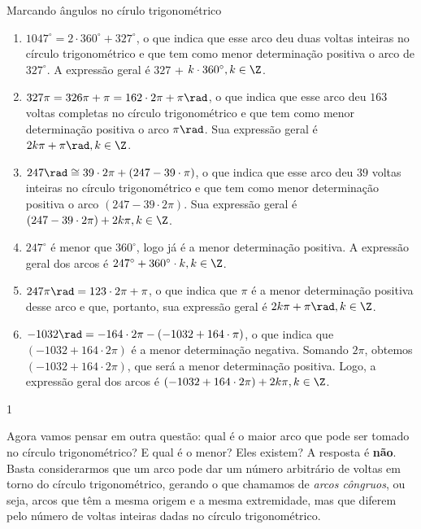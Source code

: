 \begin{answer}{Marcando ângulos no círulo trigonométrico}
{
\begin{enumerate}
\item $1047^{\circ} = 2\cdot360^{\circ} + 327^{\circ}$, o que indica que esse arco deu duas voltas inteiras no círculo trigonométrico e que tem como menor determinação positiva  o arco de $327^{\circ}$. A expressão geral é $327$ + $k\cdot360^{\circ}, k\in \Z$.

\item $327\pi=326\pi+\pi=162\cdot2\pi+\pi\rad$, o que indica que esse arco deu $163$ voltas completas no círculo trigonométrico e que tem como menor determinação positiva o arco $\pi\rad$. Sua expressão geral é $2k\pi+\pi\rad, k\in\Z$.
\item $247\rad\cong39\cdot2\pi+(247-39\cdot\pi)$, o que indica que esse arco deu $39$ voltas inteiras no círculo trigonométrico e que tem como menor determinação positiva o arco $(247-39\cdot2\pi)$. Sua expressão geral é $(247-39\cdot2\pi)+2k\pi, k\in\Z$.
\item $247^{\circ}$ é menor que $360^{\circ}$, logo já é a menor determinação positiva. A expressão geral dos arcos é $247^{\circ}+360^{\circ}\cdot k, k\in\Z$.
\item $247\pi\rad=123\cdot2\pi+\pi$, o que indica que $\pi$ é a menor determinação positiva desse arco e que, portanto, sua expressão geral é $2k\pi+\pi\rad,k \in\Z$.
\item $-1032\rad=-164\cdot2\pi-(-1032+164\cdot\pi)$, o que indica que $(-1032+164\cdot2\pi)$ é a menor determinação negativa. Somando $2\pi$, obtemos $(-1032+164\cdot2\pi)$, que será a menor determinação positiva. Logo, a expressão geral dos arcos é $(-1032+164\cdot2\pi)+2k\pi,k\in\Z$.
\end{enumerate}
}{1}
\end{answer}
Agora vamos pensar em outra questão: qual é o maior arco que pode ser tomado no círculo  trigonométrico? E qual é o menor? Eles existem? A resposta é \textbf{não}. Basta considerarmos que um arco pode dar um número arbitrário de voltas em torno do círculo trigonométrico, gerando o que chamamos de \textit{arcos côngruos}, ou seja, arcos que têm a mesma origem e a mesma extremidade, mas que diferem pelo número de voltas inteiras dadas no círculo trigonométrico.

